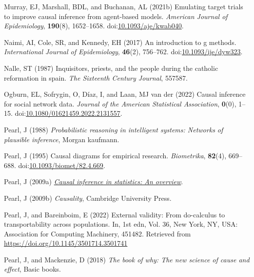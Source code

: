 \documentclass[
  singlecolumn]{article}
\newlength{\cslhangindent}
\newlength{\cslentryspacingunit} %
\newenvironment{CSLReferences}[2] %
 {%
  \setlength{\parindent}{0pt}
  \ifodd #1
  \let\oldpar\par
  \def\par{\hangindent=\cslhangindent\oldpar}
  \fi
  \setlength{\parskip}{#2\cslentryspacingunit}
 }%
 {}
\begin{document}
\begin{CSLReferences}{1}{0}
\leavevmode{}%
Murray, EJ, Marshall, BDL, and Buchanan, AL (2021b) Emulating target
trials to improve causal inference from agent-based models.
\emph{American Journal of Epidemiology}, \textbf{190}(8), 1652--1658.
doi:\href{https://doi.org/10.1093/aje/kwab040}{10.1093/aje/kwab040}.

\leavevmode{}%
Naimi, AI, Cole, SR, and Kennedy, EH (2017) An introduction to g
methods. \emph{International Journal of Epidemiology}, \textbf{46}(2),
756--762.
doi:\href{https://doi.org/10.1093/ije/dyw323}{10.1093/ije/dyw323}.

\leavevmode{}%
Nalle, ST (1987) Inquisitors, priests, and the people during the
catholic reformation in spain. \emph{The Sixteenth Century Journal},
557587.

\leavevmode{}%
Ogburn, EL, Sofrygin, O, Díaz, I, and Laan, MJ van der (2022) Causal
inference for social network data. \emph{Journal of the American
Statistical Association}, \textbf{0}(0), 1--15.
doi:\href{https://doi.org/10.1080/01621459.2022.2131557}{10.1080/01621459.2022.2131557}.

\leavevmode{}%
Pearl, J (1988) \emph{Probabilistic reasoning in intelligent systems:
Networks of plausible inference}, Morgan kaufmann.

\leavevmode{}%
Pearl, J (1995) Causal diagrams for empirical research.
\emph{Biometrika}, \textbf{82}(4), 669--688.
doi:\href{https://doi.org/10.1093/biomet/82.4.669}{10.1093/biomet/82.4.669}.

\leavevmode{}%
Pearl, J (2009a) \emph{\href{https://doi.org/10.1214/09-SS057}{Causal
inference in statistics: An overview}}.

\leavevmode{}%
Pearl, J (2009b) \emph{Causality}, Cambridge University Press.

\leavevmode{}%
Pearl, J, and Bareinboim, E (2022) External validity: From do-calculus
to transportability across populations. In, 1st edn, Vol. 36, New York,
NY, USA: Association for Computing Machinery, 451482. Retrieved from
\url{https://doi.org/10.1145/3501714.3501741}

\leavevmode{}%
Pearl, J, and Mackenzie, D (2018) \emph{The book of why: The new science
of cause and effect}, Basic books.


\end{CSLReferences}
\end{document}
